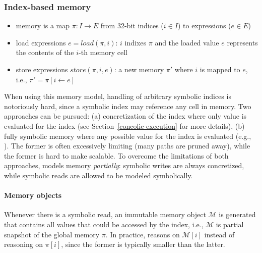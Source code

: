 \documentclass[10pt, a4paper]{article}
\begin{document}
\subsubsection{Index-based memory~\cite{MAYHEM-SP12}}
\begin{itemize}
  \item memory is a map $\pi : I \to E$ from 32-bit indices ($i \in I$) to expressions ($e \in E$)
  \item load expressions $e = load(\pi, i)$: $i$ indixes $\pi$ and the loaded value $e$ represents the contents of the $i$-th memory cell
  \item store expressions $store(\pi, i, e)$: a new memory $\pi'$ where $i$ is mapped to $e$, i.e., $\pi' = \pi[i \gets e]$
\end{itemize}
When using this memory model, handling of arbitrary symbolic indices is notoriously hard, since a symbolic index may reference any cell in memory. Two approaches can be pursued: (a) concretization of the index where only value is evaluated for the index (see Section~\ref{concolic-execution} for more details), (b) fully symbolic memory where any possible value for the index is evaluated (e.g., \cite{BAP-CAV11}). The former is often excessively limiting (many paths are pruned away), while the former is hard to make scalable. To overcome the limitations of both approaches, \cite{MAYHEM-SP12} models memory {\em partially}: symbolic writes are always concretized, while symbolic reads are allowed to be modeled symbolically.

\paragraph{Memory objects} Whenever there is a symbolic read, an immutable memory object $\mathcal{M}$ is generated that contains all values that could be accessed by the index, i.e., $\mathcal{M}$ is partial snapshot of the global memory $\pi$. In practice, \cite{MAYHEM-SP12} reasons on $\mathcal{M}[i]$ instead of reasoning on $\pi[i]$, since the former is typically smaller than the latter.
\end{document}
